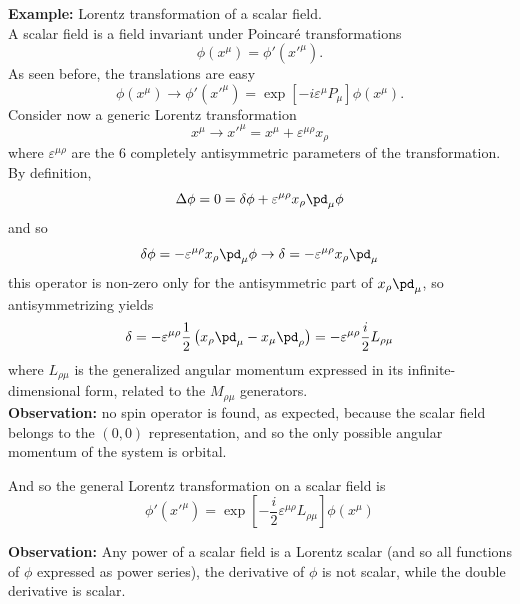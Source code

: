 \textbf{Example:} Lorentz transformation of a scalar field.\\
A scalar field is a field invariant under Poincaré transformations
$$\phi(x^\mu) = \phi'(x'^\mu).$$
As seen before, the translations are easy
$$\phi(x^\mu)\rightarrow\phi'(x'^\mu) = \exp\left[-i\varepsilon^\mu P_\mu\right]
\phi(x^\mu).$$
Consider now a generic Lorentz transformation
$$x^\mu\rightarrow x'^\mu = x^\mu + \varepsilon^{\mu\rho}x_\rho$$
where $\varepsilon^{\mu\rho}$ are the 6 completely antisymmetric parameters of the
transformation.\\
By definition,
$$\Delta \phi = 0 = \delta\phi + \varepsilon^{\mu\rho}x_\rho\pd_\mu \phi$$
and so
$$\delta\phi = -\varepsilon^{\mu\rho}x_\rho\pd_\mu\phi \rightarrow \delta
=-\varepsilon^{\mu\rho}x_\rho\pd_\mu$$
this operator is non-zero only for the antisymmetric part of $x_\rho\pd_\mu$, so
antisymmetrizing yields
$$\delta = -\varepsilon^{\mu\rho}\frac{1}{2}\left(x_\rho\pd_\mu-x_\mu\pd_\rho\right)=
-\varepsilon^{\mu\rho}\frac{i}{2}L_{\rho\mu}
$$
where $L_{\rho\mu}$ is the generalized angular momentum expressed in its
infinite-dimensional form, related to the $M_{\rho\mu}$ generators.\\
\textbf{Observation:} no spin operator is found, as expected, because the scalar
field belongs to the $(0,0)$ representation, and so the only possible angular momentum
of the system is orbital.

And so the general Lorentz transformation on a scalar field is
$$\phi'(x'^\mu) = \exp\left[-\frac{i}{2}\varepsilon^{\mu\rho}L_{\rho\mu}\right]
\phi(x^\mu)$$

\textbf{Observation:} Any power of a scalar field is a Lorentz scalar (and so all
functions of $\phi$ expressed as power series), the derivative of $\phi$ is
not scalar, while the double derivative is scalar.\\

